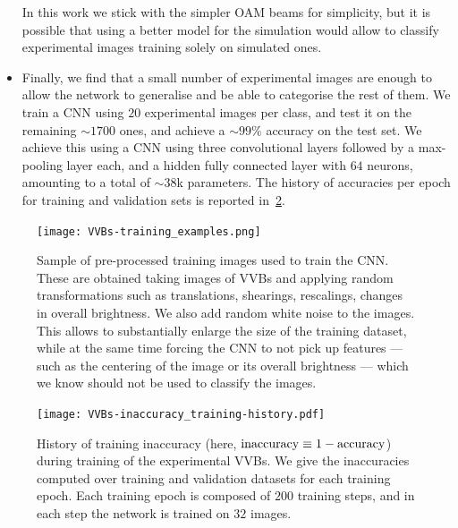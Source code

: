 \begin{itemize}
	In this work we stick with the simpler OAM beams for simplicity, but it is possible that using a better model for the simulation would allow to classify experimental images training solely on simulated ones.
	\item Finally, we find that a small number of experimental images are enough to allow the network to generalise and be able to categorise the rest of them.
	We train a CNN using $20$ experimental images per class, and test it on the remaining $\sim1700$ ones, and achieve a $\sim 99\%$ accuracy on the test set.
	We achieve this using a CNN using three convolutional layers followed by a max-pooling layer each, and a hidden fully connected layer with $64$ neurons, amounting to a total of $\sim38$k parameters. The history of accuracies per epoch for training and validation sets is reported in~\cref{fig:VVBs:training_history}.
\end{itemize}


\begin{figure}[tb]
	\centering
	\texttt{[image: VVBs-training\_examples.png]}
	\caption{Sample of pre-processed training images used to train the CNN. These are obtained taking images of VVBs and applying random transformations such as translations, shearings, rescalings, changes in overall brightness. We also add random white noise to the images.
	This allows to substantially enlarge the size of the training dataset, while at the same time forcing the CNN to not pick up features --- such as the centering of the image or its overall brightness --- which we know should not be used to classify the images.
	}
	\label{fig:VVBs:pre-processed_images}
\end{figure}

\begin{figure}[t]
	\centering
	\texttt{[image: VVBs-inaccuracy\_training-history.pdf]}
	\caption{History of training inaccuracy (here, $\operatorname{inaccuracy}\equiv1-\operatorname{accuracy}$) during training of the experimental VVBs. We give the inaccuracies computed over training and validation datasets for each training epoch. Each training epoch is composed of $200$ training steps, and in each step the network is trained on $32$ images.}
	\label{fig:VVBs:training_history}
\end{figure}

